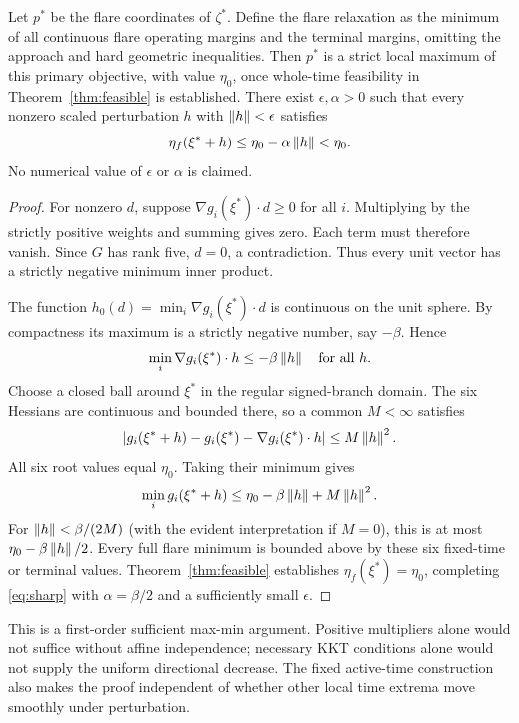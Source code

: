 \begin{theorem}\label{thm:strict}
Let $p^*$ be the flare coordinates of $\zeta^*$. Define the flare relaxation as the minimum of all continuous flare operating margins and the terminal margins, omitting the approach and hard geometric inequalities. Then $p^*$ is a strict local maximum of this primary objective, with value $\eta_0$, once whole-time feasibility in Theorem~\ref{thm:feasible} is established. There exist $\epsilon,\alpha>0$ such that every nonzero scaled perturbation $h$ with $\left\lVert h\right\rVert<\epsilon$ satisfies
\begin{equation}\label{eq:sharp}
 \eta_f(\xi^*+h)\leq\eta_0-\alpha\left\lVert h\right\rVert<\eta_0.
\end{equation}
No numerical value of $\epsilon$ or $\alpha$ is claimed.
\end{theorem}
\begin{proof}
For nonzero $d$, suppose $\nabla g_i(\xi^*)\cdot d\geq0$ for all $i$. Multiplying by the strictly positive weights and summing gives zero. Each term must therefore vanish. Since $G$ has rank five, $d=0$, a contradiction. Thus every unit vector has a strictly negative minimum inner product.

The function $h_0(d)=\min_i\nabla g_i(\xi^*)\cdot d$ is continuous on the unit sphere. By compactness its maximum is a strictly negative number, say $-\beta$. Hence
\[
 \min_i\nabla g_i(\xi^*)\cdot h\leq-\beta\left\lVert h\right\rVert
 \quad\text{for all }h.
\]
Choose a closed ball around $\xi^*$ in the regular signed-branch domain. The six Hessians are continuous and bounded there, so a common $M<\infty$ satisfies
\[
 |g_i(\xi^*+h)-g_i(\xi^*)-\nabla g_i(\xi^*)\cdot h|
 \leq M\left\lVert h\right\rVert^2.
\]
All six root values equal $\eta_0$. Taking their minimum gives
\[
 \min_i g_i(\xi^*+h)\leq\eta_0-\beta\left\lVert h\right\rVert+M\left\lVert h\right\rVert^2.
\]
For $\left\lVert h\right\rVert<\beta/(2M)$ (with the evident interpretation if $M=0$), this is at most $\eta_0-\beta\left\lVert h\right\rVert/2$. Every full flare minimum is bounded above by these six fixed-time or terminal values. Theorem~\ref{thm:feasible} establishes $\eta_f(\xi^*)=\eta_0$, completing \eqref{eq:sharp} with $\alpha=\beta/2$ and a sufficiently small $\epsilon$.
\end{proof}

This is a first-order sufficient max-min argument. Positive multipliers alone would not suffice without affine independence; necessary KKT conditions alone would not supply the uniform directional decrease. The fixed active-time construction also makes the proof independent of whether other local time extrema move smoothly under perturbation.
